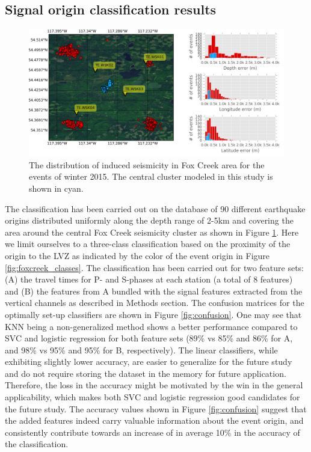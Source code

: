 \subsection{Signal origin classification results}
\begin{figure}[htb]
\begin{center}
\includegraphics[width=0.95\linewidth,angle=0]{./AntonBiryukov_bibtex/figure_map_a.png}
\end{center}
\vspace{-4mm}
\caption{The distribution of induced seismicity in Fox Creek area for the events of winter 2015. The central cluster modeled in this study is shown in cyan.}
\label{fig:map_clusters}
\end{figure}

The classification has been carried out on the database of 90 different earthquake origins distributed uniformly along the depth range of 2-5km and covering the area around the central Fox Creek seismicity cluster as shown in Figure \ref{fig:map_clusters}.
Here we limit ourselves to a three-class classification based on the proximity of the origin to the LVZ as indicated by the color of the event origin in Figure \ref{fig:foxcreek_classes}.
The classification has been carried out for two feature sets: (A) the travel times for P- and S-phases at each station (a total of 8 features) and (B) the features from A bundled with the signal features extracted from the vertical channels as described in Methods section. The confusion matrices for the optimally set-up classifiers are shown in Figure \ref{fig:confusion}. One may see that KNN being a non-generalized method shows a better performance compared to SVC and logistic regression for both feature sets (89\% vs 85\% and 86\% for A, and 98\% vs 95\% and 95\% for B, respectively). The linear classifiers, while exhibiting slightly lower accuracy, are easier to generalize for the future study and do not require storing the dataset in the memory for future application. Therefore, the loss in the accuracy might be motivated by the win in the general applicability, which makes both SVC and logistic regression good candidates for the future study. The accuracy values shown in Figure \ref{fig:confusion} suggest that the added features indeed carry valuable information about the event origin, and consistently contribute towards an increase of in average 10\% in the accuracy of the classification.



